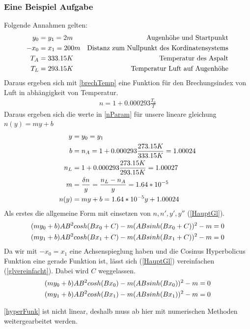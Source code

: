 \subsubsection{Eine Beispiel Aufgabe}
Folgende Annahmen gelten:
\begin{align}
	y_0&=y_1=2 m & \text{Augenhöhe und Startpunkt} \notag \\
	-x_0&=x_1 = 200m & \text{Distanz zum Nullpunkt des Kordinatensystems} \notag \\
	T_A&=333.15 K & \text{Temperatur des Aspalt}  \notag \\
	T_L&=293.15 K & \text{Temperatur Luft auf Augenhöhe}  \notag
\end{align}
Daraus ergeben sich mit \eqref{brechTemp} eine Funktion für den Brechungsindex von Luft in abhängigkeit von Temperatur.
\begin{align}
	n=1+0.000293\frac{T_0}{T}
	\label{brechTemp}
\end{align}
Daraus ergeben sich die werte in \eqref{nParam} für unsere lineare gleichung $n(y)=my+b$
\begin{align}
	y&=y_0=y_1 \notag \\
	b&=n_A=1+0.000293\frac{273.15 K}{333.15 K} = 1.00024 \notag \\
	n_L&=1+0.000293\frac{273.15 K}{293.15 K} = 1.00027 \notag \\
	m&=\frac{\delta n}{y}=\frac{n_L-n_A}{y}=1.64*10^{-5} \notag \\
	n(y)&=my+b=1.64*10^{-5}y +1.00024
	\label{nParam}
\end{align}
Als erstes die allgemeine Form mit einsetzen von $n,n',y',y''$ (\eqref{HauptGl}).
\begin{align}
	(my_0+b)A B^2 cosh(B x_0 + C)-m (A B sinh(B x_0 + C))^2-m &= 0\notag \\
	(my_1+b)A B^2 cosh(B x_1 + C)-m (A B sinh(B x_1 + C))^2-m &=0 \label{HauptGl}
\end{align}
Da wir mit $-x_0=x_1$ eine Achsenspieglung haben und die Cosinus Hyperbolicus Funktion eine gerade Funktion ist, lässt sich (\eqref{HauptGl}) vereinfachen (\eqref{glvereinfacht}). Dabei wird $C$ weggelassen.
\begin{align}
	(my_0+b)A B^2 cosh(B x_0 )-m (A B sinh(B x_0 ))^2-m &= 0\notag \\
	(my_1+b)A B^2 cosh(B x_1 )-m (A B sinh(B x_1 ))^2-m &=0 \label{glvereinfacht}
\end{align}

 \eqref{hyperFunk}  ist nicht linear, deshalb muss ab hier mit numerischen Methoden weitergearbeitet werden.
 
